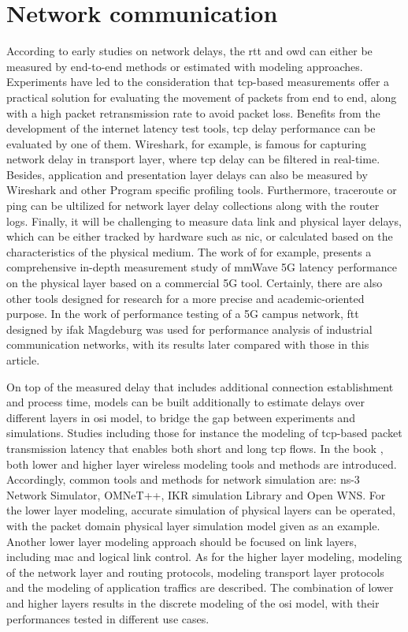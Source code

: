 \section{Network communication}
According to early studies on network delays, the \gls{rtt} and \gls{owd} 
can either be measured by end-to-end methods or estimated with modeling 
approaches. Experiments have led to the consideration that \gls{tcp}-based 
measurements offer a practical solution for evaluating the movement of 
packets from end to end, along with a high packet retransmission rate 
to avoid packet loss\cite{paxson_end--end_1999}. Benefits from 
the development of the internet latency test tools, \gls{tcp} delay 
performance can be evaluated by one of them. Wireshark, for example, is famous 
for capturing network delay in transport layer, where \gls{tcp} delay 
can be filtered in real-time\cite{dsouza_transmission_2020}. Besides, 
application and presentation layer delays can also be measured by Wireshark and 
other Program 
specific profiling tools\cite{heger_application_2017}. Furthermore, 
traceroute or ping can be ultilized 
for network layer delay collections along with the router logs\cite{Deri2003}. 
Finally, it will be challenging to measure 
data link and physical layer delays, which can be either tracked by hardware 
such as \gls{nic}, or calculated based on the characteristics 
of the physical medium. The work of \cite{Fezeu2023} for example, 
presents a comprehensive 
in-depth measurement study of mmWave 5G latency performance on the physical layer 
based on a commercial 5G tool.   
Certainly, there are also other tools designed for research for a more 
precise and academic-oriented purpose. In the work of performance testing 
of a 5G campus network, \gls{ftt} designed by ifak Magdeburg was used 
for performance analysis of industrial communication networks\cite{cainelli_performance_2023}, 
with its results later compared with those in this article.


On top of the measured delay 
that includes additional connection establishment and process time, 
models can be built additionally to estimate delays over different layers in 
\gls{osi} model, to bridge the gap between experiments and simulations. 
Studies including those for instance the modeling of \gls{tcp}-based 
packet transmission latency that enables both short and 
long \gls{tcp} flows\cite{luan_estimating_2019}. In the book \cite{wehrle2010modeling}, 
both lower and higher layer wireless modeling tools and methods are introduced. 
Accordingly, common tools and methods for network simulation are: ns-3 Network Simulator, OMNeT++, 
IKR simulation Library and Open WNS. For the lower layer modeling, accurate simulation 
of physical layers can be operated, with the packet domain physical layer simulation 
model given as an example. Another lower layer modeling approach should be focused on 
link layers, including \gls{mac} and logical link control. As for the higher layer 
modeling, modeling of the network layer and routing protocols, modeling 
transport layer protocols and the modeling of application traffics are described. 
The combination of lower and higher layers results in the discrete modeling 
of the \gls{osi} model, with their performances tested in different use cases. 




